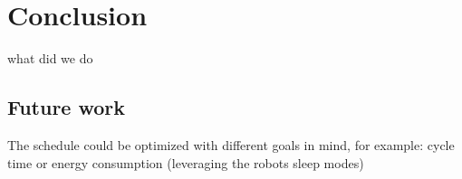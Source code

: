 \chapter{Conclusion}
\label{ch:conclusion}
\graphicspath{{chapters/Conclusion/}}

what did we do

\section{Future work}

The schedule could be optimized with different goals in mind, for example: cycle time or energy consumption (leveraging the robots sleep modes) \cite{EnergyOptimisationBukata}